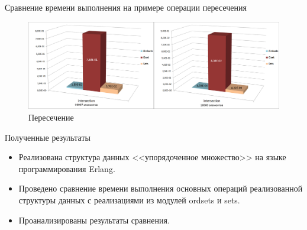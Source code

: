 \documentclass{beamer}
\begin{document}
\begin{frame}{Сравнение времени выполнения на примере операции пересечения}
	\begin{figure}
		\includegraphics[scale=0.18]{img/histograms/intersection.png}
		\caption{Пересечение}
	\end{figure}		
\end{frame}
	
\begin{frame}{Полученные результаты}
	\begin{itemize}
		\item Реализована структура данных <<упорядоченное множество>> на языке программирования Erlang.
		\item Проведено сравнение времени выполнения основных операций реализованной структуры данных с 
				реализациями из модулей ordsets и sets. 
		\item Проанализированы результаты сравнения.
	\end{itemize}
\end{frame}
\end{document}
